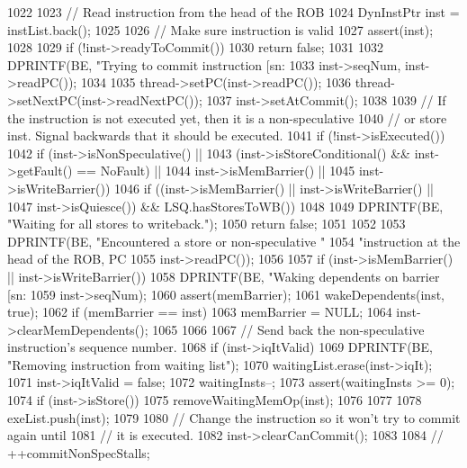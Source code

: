 \begin{DoxyCode}
1022 {
1023     // Read instruction from the head of the ROB
1024     DynInstPtr inst = instList.back();
1025 
1026     // Make sure instruction is valid
1027     assert(inst);
1028 
1029     if (!inst->readyToCommit())
1030         return false;
1031 
1032     DPRINTF(BE, "Trying to commit instruction [sn:%
1033             inst->seqNum, inst->readPC());
1034 
1035     thread->setPC(inst->readPC());
1036     thread->setNextPC(inst->readNextPC());
1037     inst->setAtCommit();
1038 
1039     // If the instruction is not executed yet, then it is a non-speculative
1040     // or store inst.  Signal backwards that it should be executed.
1041     if (!inst->isExecuted()) {
1042         if (inst->isNonSpeculative() ||
1043             (inst->isStoreConditional() && inst->getFault() == NoFault) ||
1044             inst->isMemBarrier() ||
1045             inst->isWriteBarrier()) {
1046             if ((inst->isMemBarrier() || inst->isWriteBarrier() ||
1047                     inst->isQuiesce()) && LSQ.hasStoresToWB())
1048             {
1049                 DPRINTF(BE, "Waiting for all stores to writeback.\n");
1050                 return false;
1051             }
1052 
1053             DPRINTF(BE, "Encountered a store or non-speculative "
1054                     "instruction at the head of the ROB, PC %
1055                     inst->readPC());
1056 
1057             if (inst->isMemBarrier() || inst->isWriteBarrier()) {
1058                 DPRINTF(BE, "Waking dependents on barrier [sn:%
1059                         inst->seqNum);
1060                 assert(memBarrier);
1061                 wakeDependents(inst, true);
1062                 if (memBarrier == inst)
1063                     memBarrier = NULL;
1064                 inst->clearMemDependents();
1065             }
1066 
1067             // Send back the non-speculative instruction's sequence number.
1068             if (inst->iqItValid) {
1069                 DPRINTF(BE, "Removing instruction from waiting list\n");
1070                 waitingList.erase(inst->iqIt);
1071                 inst->iqItValid = false;
1072                 waitingInsts--;
1073                 assert(waitingInsts >= 0);
1074                 if (inst->isStore())
1075                     removeWaitingMemOp(inst);
1076             }
1077 
1078             exeList.push(inst);
1079 
1080             // Change the instruction so it won't try to commit again until
1081             // it is executed.
1082             inst->clearCanCommit();
1083 
1084 //            ++commitNonSpecStalls;
}}}
\end{DoxyCode}
